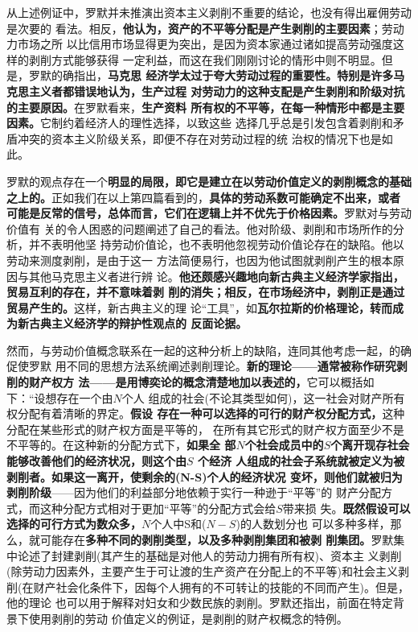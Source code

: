 从上述例证中，罗默并未推演出资本主义剥削不重要的结论，也没有得出雇佣劳动是次要的
看法。相反，\textbf{他认为，资产的不平等分配是产生剥削的主要因素}；劳动力市场之所
以比信用市场显得更为突出，是因为资本家通过诸如提高劳动强度这样的剥削方式能够获得
一定利益，而这在我们刚刚讨论的情形中则不明显。但是，罗默的确指出，\textbf{马克思
  经济学太过于夸大劳动过程的重要性。特别是许多马克思主义者都错误地认为，生产过程
  对劳动力的这种支配是产生剥削和阶级对抗的主要原因。}在罗默看来，\textbf{生产资料
  所有权的不平等，在每一种情形中都是主要因素。}它制约着经济人的理性选择，以致这些
选择几乎总是引发包含着剥削和矛盾冲突的资本主义阶级关系，即便不存在对劳动过程的统
治权的情况下也是如此。

罗默的观点存在一个\textbf{明显的局限，即它是建立在以劳动价值定义的剥削概念的基础
  之上的。}正如我们在以上第四篇看到的，\textbf{具体的劳动系数可能确定不出来，或者
  可能是反常的信号，总体而言，它们在逻辑上并不优先于价格因素。}罗默对与劳动价值有
关的令人困惑的问题阐述了自己的看法。他对阶级、剥削和市场所作的分析，并不表明他坚
持劳动价值论，也不表明他忽视劳动价值论存在的缺陷。他以劳动来测度剥削，是由于这一
方法简便易行，也因为他试图就剥削产生的根本原因与其他马克思主义者进行辨
论。\textbf{他还颇感兴趣地向新古典主义经济学家指出，贸易互利的存在，并不意味着剥
  削的消失；相反，在市场经济中，剥削正是通过贸易产生的。}这样，新古典主义的理
论“工具”，如\textbf{瓦尔拉斯的价格理论，转而成为新古典主义经济学的辩护性观点的
  反面论据。}

然而，与劳动价值概念联系在一起的这种分析上的缺陷，连同其他考虑一起，的确促使罗默
用不同的思想方法系统阐述剥削理论。\textbf{新的理论——通常被称作研究剥削的财产权方
  法——是用博奕论的概念清楚地加以表述的，}它可以概括如下：“设想存在一个由$N$个人
组成的社会(不论其类型如何)，这一社会对财产所有权分配有着清晰的界定。\textbf{假设
  存在一种可以选择的可行的财产权分配方式，}这种分配在某些形式的财产权方面是平等的，
在所有其它形式的财产权方面至少不是不平等的。在这种新的分配方式下，\textbf{如果全
  部$N$个社会成员中的$S$个离开现存社会能够改善他们的经济状况，则这个由$S$ 个经济
  人组成的社会子系统就被定义为被剥削者。如果这一离开，使剩余的(N-S)个人的经济状况
  变坏，则他们就被归为剥削阶级}——因为他们的利益部分地依赖于实行一种逊于“平等”的
财产分配方式，而这种分配方式相对于更加“平等”的分配方式会给$S$带来损
失。\textbf{既然假设可以选择的可行方式为数众多，}$N$个人中S和($N-S$)的人数划分也
可以多种多样，那么，就可能存在\textbf{多种不同的剥削类型，以及多种剥削集团和被剥
  削集团。}罗默集中论述了封建剥削(其产生的基础是对他人的劳动力拥有所有权)、资本主
义剥削(除劳动力因素外，主要产生于可让渡的生产资产在分配上的不平等)和社会主义剥
削(在财产社会化条件下，因每个人拥有的不可转让的技能的不同而产生)。但是，他的理论
也可以用于解释对妇女和少数民族的剥削。罗默还指出，前面在特定背景下使用剥削的劳动
价值定义的例证，是剥削的财产权概念的特例。

